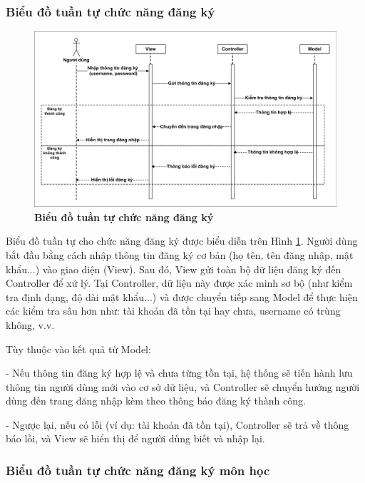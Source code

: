 \documentclass{article}
\begin{document}
	\subsubsection{Biểu đồ tuần tự chức năng đăng ký}
	
	\begin{figure}[!ht]
		\centering
		\includegraphics[trim= 10pt 10pt 10pt 10pt, clip, width=16cm]{sequence_fig316_1.pdf}
		\caption [Biểu đồ tuần tự chức năng đăng ký]{\bfseries \fontsize{12pt}{0pt}\selectfont Biểu đồ tuần tự chức năng đăng ký}
		\label{fig316}
	\end{figure}
	
	Biểu đồ tuần tự cho chức năng đăng ký được biểu diễn trên Hình \ref{fig316}. Người dùng bắt đầu bằng cách nhập thông tin đăng ký cơ bản (họ tên, tên đăng nhập, mật khẩu...) vào giao diện (View). Sau đó, View gửi toàn bộ dữ liệu đăng ký đến Controller để xử lý. Tại Controller, dữ liệu này được xác minh sơ bộ (như kiểm tra định dạng, độ dài mật khẩu...) và được chuyển tiếp sang Model để thực hiện các kiểm tra sâu hơn như: tài khoản đã tồn tại hay chưa, username có trùng không, v.v.
	
	Tùy thuộc vào kết quả từ Model:
	
	- Nếu thông tin đăng ký hợp lệ và chưa từng tồn tại, hệ thống sẽ tiến hành lưu thông tin người dùng mới vào cơ sở dữ liệu, và Controller sẽ chuyển hướng người dùng đến trang đăng nhập kèm theo thông báo đăng ký thành công.
	
	- Ngược lại, nếu có lỗi (ví dụ: tài khoản đã tồn tại), Controller sẽ trả về thông báo lỗi, và View sẽ hiển thị để người dùng biết và nhập lại.
	
	\subsubsection{Biểu đồ tuần tự chức năng đăng ký môn học}
	
\end{document}
